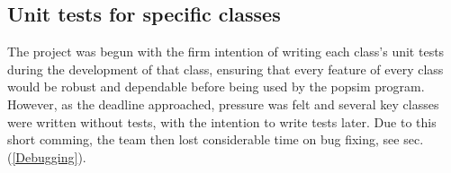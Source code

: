 \subsection{Unit tests for specific classes}
The project was begun with the firm intention of writing each class's unit tests during the development of that class, ensuring that every feature of every class would be robust and dependable before being used by the popsim program.  However, as the deadline approached, pressure was felt and several key classes were written without tests, with the intention to write tests later.
Due to this short comming, the team then lost considerable time on bug fixing, see sec.(\ref{Debugging}).


%


